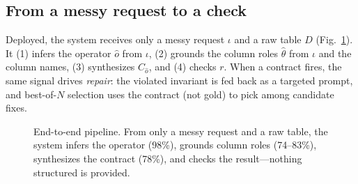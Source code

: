 \documentclass[10pt,twocolumn,letterpaper]{article}
\begin{document}
\subsection{From a messy request to a check}
Deployed, the system receives only a messy request $\iota$ and a raw table $D$
(Fig.~\ref{fig:pipe}). It (1) infers the operator $\hat o$ from $\iota$,
(2) grounds the column roles $\hat\theta$ from $\iota$ and the column names,
(3) synthesizes $C_{\hat o}$, and (4) checks $r$. When a contract fires, the
same signal drives \emph{repair}: the violated invariant is fed back as a
targeted prompt, and best-of-$N$ selection uses the contract (not gold) to pick
among candidate fixes.

\begin{figure}[t]\centering
{}
\caption{End-to-end pipeline. From only a messy request and a raw table, the
system infers the operator (98\%), grounds column roles (74--83\%), synthesizes
the contract (78\%), and checks the result---nothing structured is provided.}
\label{fig:pipe}
\end{figure}
\end{document}
